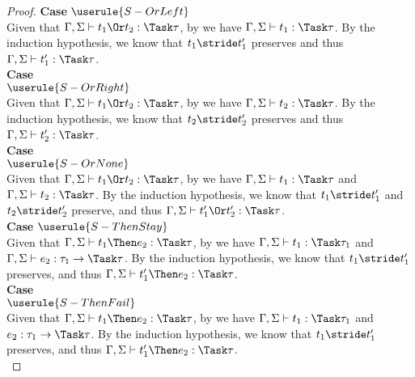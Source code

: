 \begin{proof}
  \noindent\textbf{Case} $\userule{S-OrLeft}$ \\
    \indent  Given that
  $\Gamma,\Sigma\infers t_1\Or t_2:\Task\tau$, by  we have
  $\Gamma,\Sigma\infers t_1:\Task\tau$. By the induction hypothesis, we know that
  $t_1\stride t_1'$ preserves and thus $\Gamma,\Sigma\infers t_1':\Task\tau$.\\

  \noindent\textbf{Case}\\
  $\userule{S-OrRight}$ \\
    \indent  Given that
  $\Gamma,\Sigma\infers t_1\Or t_2:\Task\tau$, by  we have $\Gamma,\Sigma\infers t_2:\Task\tau$. By the induction hypothesis, we know that
  $t_2\stride t_2'$ preserves and thus $\Gamma,\Sigma\infers t_2':\Task\tau$.\\

  \noindent\textbf{Case}\\
  $\userule{S-OrNone}$ \\
    \indent  Given that
  $\Gamma,\Sigma\infers t_1\Or t_2:\Task\tau$, by  we have
  $\Gamma,\Sigma\infers t_1:\Task\tau$ and $\Gamma,\Sigma\infers t_2:\Task\tau$.
  By the induction hypothesis, we know that $t_1\stride t_1'$ and
  $t_2\stride t_2'$ preserve, and thus
  $\Gamma,\Sigma\infers t_1'\Or t_2':\Task\tau$.\\

  \noindent\textbf{Case} $\userule{S-ThenStay}$ \\
    \indent  Given that
  $\Gamma,\Sigma\infers t_1\Then e_2:\Task\tau$,
  by  we have $\Gamma,\Sigma\infers t_1:\Task\tau_1$ and
  $\Gamma,\Sigma\infers e_2:\tau_1\to\Task\tau$. By the induction
  hypothesis, we know that $t_1\stride t_1'$ preserves, and thus
  $\Gamma,\Sigma\infers t_1'\Then e_2:\Task\tau$.\\

  \noindent\textbf{Case}\\
   $\userule{S-ThenFail}$ \\
    \indent  Given that
  $\Gamma,\Sigma\infers t_1\Then e_2:\Task\tau$,
  by  we have $\Gamma,\Sigma\infers t_1:\Task\tau_1$ and
  $e_2:\tau_1\to\Task\tau$. By the induction
  hypothesis, we know that $t_1\stride t_1'$ preserves, and thus
  $\Gamma,\Sigma\infers t_1'\Then e_2:\Task\tau$.\\


\end{proof}
